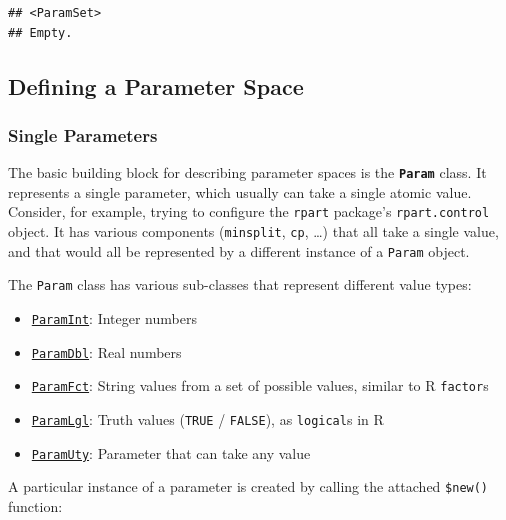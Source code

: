 \documentclass[
]{scrbook}
\providecommand{\tightlist}{%
  \setlength{\itemsep}{0pt}\setlength{\parskip}{0pt}}
\begin{document}
\begin{verbatim}
## <ParamSet>
## Empty.
\end{verbatim}

\hypertarget{defining-a-parameter-space}{%
\subsection{Defining a Parameter Space}\label{defining-a-parameter-space}}

\hypertarget{single-parameters}{%
\subsubsection{Single Parameters}\label{single-parameters}}

The basic building block for describing parameter spaces is the \textbf{\texttt{Param}} class.
It represents a single parameter, which usually can take a single atomic value.
Consider, for example, trying to configure the \texttt{rpart} package's \texttt{rpart.control} object.
It has various components (\texttt{minsplit}, \texttt{cp}, \ldots) that all take a single value, and that would all be represented by a different instance of a \texttt{Param} object.

The \texttt{Param} class has various sub-classes that represent different value types:

\begin{itemize}
\tightlist
\item
  \href{https://paradox.mlr-org.com/reference/ParamInt.html}{\texttt{ParamInt}}: Integer numbers
\item
  \href{https://paradox.mlr-org.com/reference/ParamDbl.html}{\texttt{ParamDbl}}: Real numbers
\item
  \href{https://paradox.mlr-org.com/reference/ParamFct.html}{\texttt{ParamFct}}: String values from a set of possible values, similar to R \texttt{factor}s
\item
  \href{https://paradox.mlr-org.com/reference/ParamLgl.html}{\texttt{ParamLgl}}: Truth values (\texttt{TRUE} / \texttt{FALSE}), as \texttt{logical}s in R
\item
  \href{https://paradox.mlr-org.com/reference/ParamUty.html}{\texttt{ParamUty}}: Parameter that can take any value
\end{itemize}

A particular instance of a parameter is created by calling the attached \texttt{\$new()} function:
\end{document}
